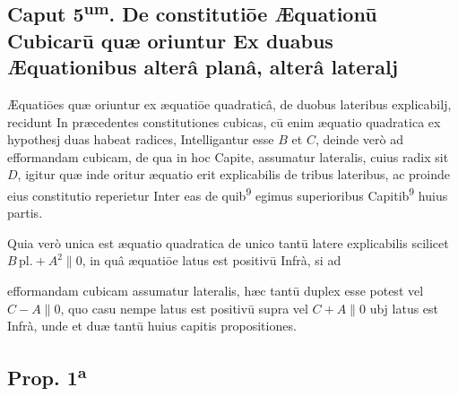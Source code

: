 \documentclass[11pt,a4paper]{article}
\begin{document}
\subsection*{Caput 5\textsuperscript{um}. De constitutiōe Æquationū Cubicarū quæ oriuntur Ex duabus Æquationibus alterâ planâ, alterâ lateralj}

Æquatiōes quæ oriuntur ex æquatiōe quadraticâ, de duobus lateribus explicabilj, recidunt In præcedentes constitutiones cubicas, cū enim æquatio quadratica ex hypothesj duas habeat radices, Intelligantur esse $B$ et $C$, deinde verò ad efformandam cubicam, de qua in hoc Capite, assumatur lateralis, cuius radix sit $D$, igitur quæ inde oritur æquatio erit explicabilis de tribus lateribus, ac proinde eius constitutio reperietur Inter eas de quib\textsuperscript{9} egimus superioribus Capitib\textsuperscript{9} huius partis.

Quia verò unica est  æquatio quadratica de unico tantū latere explicabilis scilicet $B\,\mathrm{pl.} + A^{2} \parallel 0$, in quâ æquatiōe latus est positivū Infrà, si ad


efformandam cubicam assumatur lateralis, hæc tantū duplex esse potest vel $C - A \parallel 0$, quo casu nempe latus est positivū supra vel $C + A \parallel 0$ ubj latus est Infrà, unde et duæ tantū huius capitis propositiones.

\subsection*{Prop. 1\textsuperscript{a}}
\end{document}
